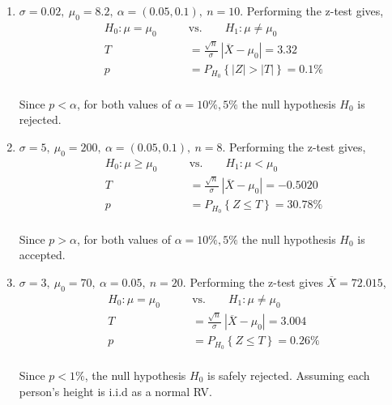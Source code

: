 \begin{enumerate}
	
	\item $ \sigma = 0.02,\ \mu_0 = 8.2,\ \alpha = (0.05, 0.1),\ n = 10$. Performing the z-test gives,\\
	
		\begin{align}
			H_0 : \mu = \mu_0 \qquad &\text{vs.} \qquad H_1 : \mu \neq \mu_0 \nonumber \\
			T &= \frac{\sqrt{n}}{\sigma}\ |\overline{X} - \mu_0| = 3.32 \nonumber \\
			p &= P_{H_0}\left\{|Z| > |T|\right\} = 0.1\% 
		\end{align}\\
		Since $ p < \alpha $,  for both values of $ \alpha = 10\%, 5\% $ the null hypothesis $ H_0 $ is rejected.\\
	
	
	\item $ \sigma = 5,\ \mu_0 = 200,\ \alpha = (0.05, 0.1),\ n = 8$. Performing the z-test gives,\\
	
		\begin{align}
			H_0 : \mu \geq \mu_0 \qquad &\text{vs.} \qquad H_1 : \mu < \mu_0 \nonumber \\
			T &= \frac{\sqrt{n}}{\sigma}\ |\overline{X} - \mu_0| = -0.5020 \nonumber \\
			p &= P_{H_0}\left\{Z \leq T\right\} = 30.78\% 
		\end{align}\\
		Since $ p > \alpha $,  for both values of $ \alpha = 10\%, 5\% $ the null hypothesis $ H_0 $ is accepted.\\
	
	
	\item $ \sigma = 3,\ \mu_0 = 70,\ \alpha = 0.05,\ n = 20$. Performing the z-test gives $ \overline{X} = 72.015 $,\\
	
		\begin{align}
			H_0 : \mu = \mu_0 \qquad &\text{vs.} \qquad H_1 : \mu \neq \mu_0 \nonumber \\
			T &= \frac{\sqrt{n}}{\sigma}\ |\overline{X} - \mu_0| = 3.004 \nonumber \\
			p &= P_{H_0}\left\{Z \leq T\right\} = 0.26\% 
		\end{align}\\
		Since $ p < 1\% $, the null hypothesis $ H_0 $ is safely rejected. Assuming each person's height is i.i.d as a normal RV.\\
	

\end{enumerate}
